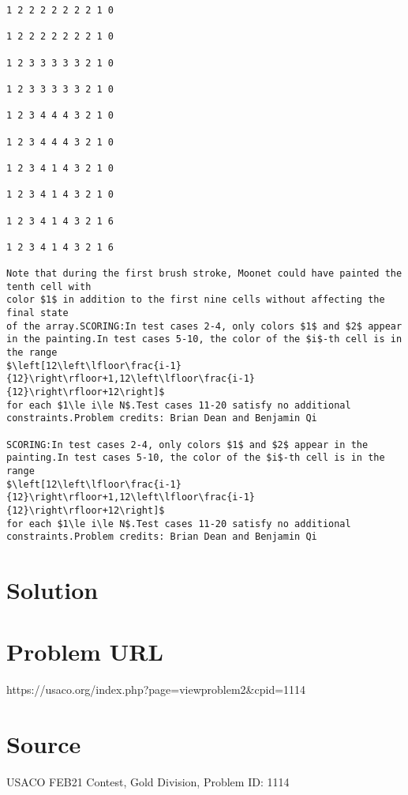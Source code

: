 \documentclass[12pt]{article}
\begin{document}
\begin{verbatim}
1 2 2 2 2 2 2 2 1 0

1 2 2 2 2 2 2 2 1 0

1 2 3 3 3 3 3 2 1 0

1 2 3 3 3 3 3 2 1 0

1 2 3 4 4 4 3 2 1 0

1 2 3 4 4 4 3 2 1 0

1 2 3 4 1 4 3 2 1 0

1 2 3 4 1 4 3 2 1 0

1 2 3 4 1 4 3 2 1 6

1 2 3 4 1 4 3 2 1 6

Note that during the first brush stroke, Moonet could have painted the tenth cell with
color $1$ in addition to the first nine cells without affecting the final state
of the array.SCORING:In test cases 2-4, only colors $1$ and $2$ appear in the painting.In test cases 5-10, the color of the $i$-th cell is in the range 
$\left[12\left\lfloor\frac{i-1}{12}\right\rfloor+1,12\left\lfloor\frac{i-1}{12}\right\rfloor+12\right]$
for each $1\le i\le N$.Test cases 11-20 satisfy no additional constraints.Problem credits: Brian Dean and Benjamin Qi

SCORING:In test cases 2-4, only colors $1$ and $2$ appear in the painting.In test cases 5-10, the color of the $i$-th cell is in the range 
$\left[12\left\lfloor\frac{i-1}{12}\right\rfloor+1,12\left\lfloor\frac{i-1}{12}\right\rfloor+12\right]$
for each $1\le i\le N$.Test cases 11-20 satisfy no additional constraints.Problem credits: Brian Dean and Benjamin Qi
\end{verbatim}

\section*{Solution}


\section*{Problem URL}
https://usaco.org/index.php?page=viewproblem2&cpid=1114

\section*{Source}
USACO FEB21 Contest, Gold Division, Problem ID: 1114
\end{document}
